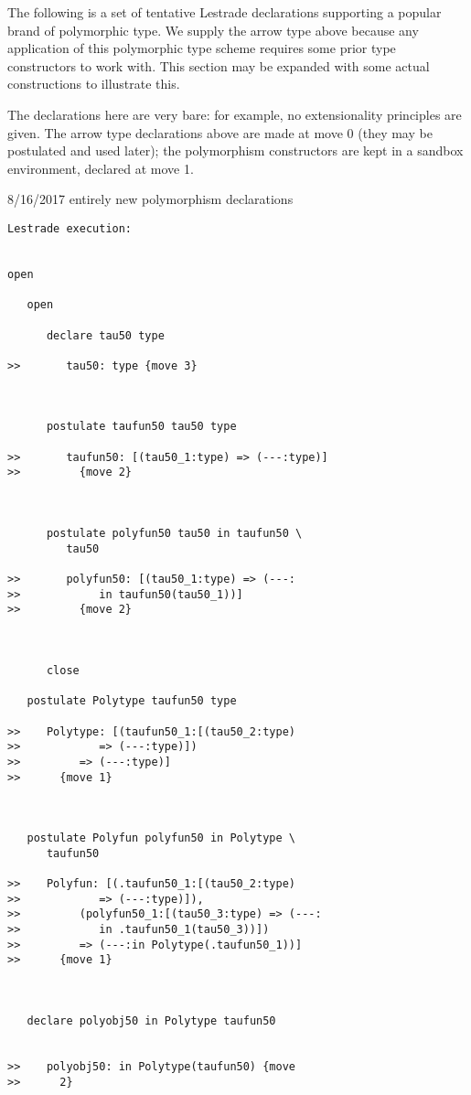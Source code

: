 \documentclass[12pt]{article}
\begin{document}
The following is a set of tentative Lestrade declarations supporting a popular brand of polymorphic type.  We supply the arrow type above
because any application of this polymorphic type scheme requires some prior type constructors to work with.  This section may be expanded with some actual constructions to illustrate this.

The declarations here are very bare:  for example, no extensionality principles are given.  The arrow type declarations above are made at move 0
(they may be postulated and used later);  the polymorphism constructors are kept in a sandbox environment, declared at move 1.

8/16/2017 entirely new polymorphism declarations

\begin{verbatim}Lestrade execution:


open

   open

      declare tau50 type

>>       tau50: type {move 3}



      postulate taufun50 tau50 type

>>       taufun50: [(tau50_1:type) => (---:type)]
>>         {move 2}



      postulate polyfun50 tau50 in taufun50 \
         tau50

>>       polyfun50: [(tau50_1:type) => (---:
>>            in taufun50(tau50_1))]
>>         {move 2}



      close

   postulate Polytype taufun50 type

>>    Polytype: [(taufun50_1:[(tau50_2:type)
>>            => (---:type)])
>>         => (---:type)]
>>      {move 1}



   postulate Polyfun polyfun50 in Polytype \
      taufun50

>>    Polyfun: [(.taufun50_1:[(tau50_2:type)
>>            => (---:type)]),
>>         (polyfun50_1:[(tau50_3:type) => (---:
>>            in .taufun50_1(tau50_3))])
>>         => (---:in Polytype(.taufun50_1))]
>>      {move 1}



   declare polyobj50 in Polytype taufun50


>>    polyobj50: in Polytype(taufun50) {move
>>      2}




\end{verbatim}
\end{document}
